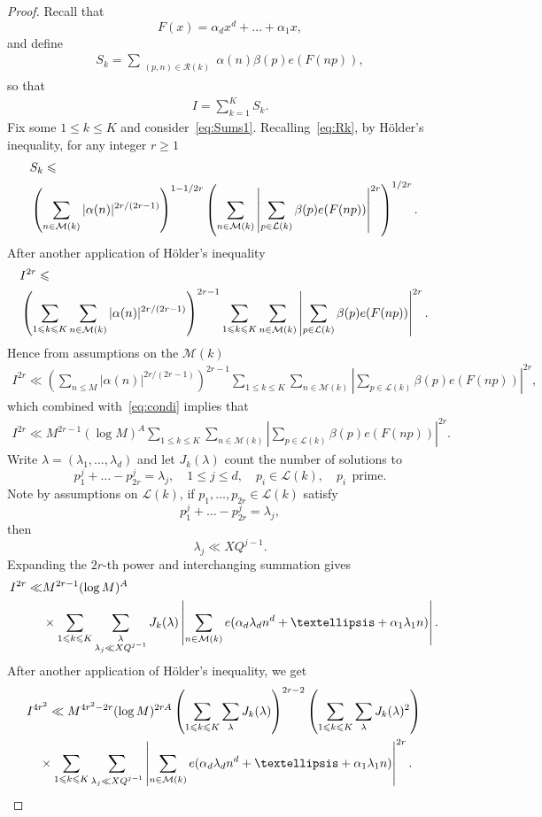 \documentclass[12pt]{amsart}
\def\cL{{\mathcal L}}
\def\cM{{\mathcal M}}
\def\cR{{\mathcal R}}
\def\\{\cr}
\def\le{\leqslant}
\def\ge{\geqslant}
\begin{document}
\begin{proof}

Recall that
$$F(x)=\alpha_d x^d+\dots+\alpha_1 x,$$
and define
\begin{align}
\label{eq:Sums1}
S_k=\sum_{\substack{(p,n)\in \cR(k)}}\alpha(n)\beta(p)e(F(np)),
\end{align}
so that 
\begin{align}
\label{eq:IS}
I=\sum_{k=1}^{K}S_k.
\end{align}
Fix some $1\le k \le K$ and consider~\eqref{eq:Sums1}. Recalling~\eqref{eq:Rk}, by H\"{o}lder's inequality, for any integer $r\ge 1$
\begin{align*}
&S_{k}\le \\ & \left(\sum_{n\in \cM(k)}|\alpha(n)|^{2r/(2r-1)}\right)^{1-1/2r}\left(\sum_{n\in \cM(k)}\left|\sum_{p\in \cL(k)}\beta(p)e(F(np))\right|^{2r}\right)^{1/2r}.
\end{align*}
After another application of H\"{o}lder's inequality 
\begin{align*}
&I^{2r}\le \\
&\left(\sum_{1\le k \le K}\sum_{n\in \cM(k)}|\alpha(n)|^{2r/(2r-1)} \right)^{2r-1}\sum_{1\le k \le K}\sum_{n\in \cM(k)}\left|\sum_{p\in \cL(k)}\beta(p)e(F(np))\right|^{2r}.
\end{align*}
Hence from assumptions on the $\cM(k)$
\begin{align*}
I^{2r}\ll \left( \sum_{n \le M} |\alpha (n)|^{2r/(2r-1)} \right)^{2r-1}\sum_{1\le k \le K}\sum_{n\in \cM(k)}\left|\sum_{p\in \cL(k)}\beta(p)e(F(np))\right|^{2r},
\end{align*}
which combined with~\eqref{eq:condi} implies that 
\begin{align*}
I^{2r}\ll  M^{2r-1}(\log{M})^{A } \sum_{1\le k \le K}\sum_{n\in \cM(k)}\left|\sum_{p\in \cL(k)}\beta(p)e(F(np))\right|^{2r}.
\end{align*}
Write $\lambda=(\lambda_1,\dots,\lambda_d)$ and let $J_k(\lambda)$ count the number of solutions to 
$$p_1^{j}+\dots-p_{2r}^j=\lambda_j, \quad 1\le j \le d, \quad p_i\in \cL(k), \quad p_i \ \ \text{prime}.$$
Note by assumptions on $\cL(k)$, if $p_1,\dots,p_{2r}\in \cL(k)$ satisfy 
$$p_1^{j}+\dots-p_{2r}^j=\lambda_j,$$
then 
$$\lambda_j\ll XQ^{j-1}.$$
Expanding the $2r$-th power and interchanging summation gives
\begin{align*}
I^{2r}\ll& M^{2r-1}(\log{M})^{A}\\ & \times \sum_{1\le k \le K}\sum_{\substack{\lambda \\ \lambda_j \ll XQ^{j-1}}} J_k(\lambda)\left|\sum_{n\in \cM(k)}e(\alpha_d\lambda_d n^{d}+\dots+\alpha_1\lambda_1 n)\right|.
\end{align*}
After another application of H\"{o}lder's inequality, we get  
\begin{align*}
& I^{4r^2}\ll M^{4r^2-2r}(\log{M})^{2rA}\left(\sum_{1\le k \le K}\sum_{\lambda} J_k(\lambda)\right)^{2r-2}\left(\sum_{1\le k \le K}\sum_{\lambda} J_k(\lambda)^2\right) \\ 
& \quad \times \sum_{1\le k \le K}\sum_{\substack{ \lambda_j \ll XQ^{j-1}}}\left|\sum_{n\in \cM(k)}e(\alpha_d\lambda_d n^{d}+\dots+\alpha_1\lambda_1 n)\right|^{2r}.
\end{align*}


\end{proof}
\end{document}

